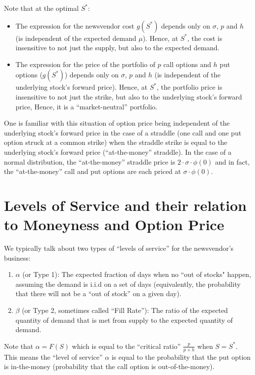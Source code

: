 \documentclass[11pt, oneside]{article}   	%
\begin{document}
Note that at the optimal $S^*$:

\begin{itemize}
\item The expression for the newsvendor cost $g(S^*)$ depends only on $\sigma$, $p$ and $h$ (is independent of the expected demand $\mu$). Hence, at $S^*$, the cost is insensitive to not just the supply, but also to the expected demand.
\item The expression for the price of the portfolio of $p$ call options and $h$ put options ($g(S^*)$) depends only on $\sigma$, $p$ and $h$ (is independent of the underlying stock's forward price). Hence, at $S^*$, the portfolio price is insensitive to not just the strike, but also to the underlying stock's forward price, Hence, it is a ``market-neutral'' portfolio.
\end{itemize}

One is familiar with this situation of option price being independent of the underlying stock's forward price in the case of a straddle (one call and one put option struck at a common strike) when the straddle strike is equal to the underlying stock's forward price (``at-the-money'' straddle). In the case of a normal distribution, the ``at-the-money'' straddle price is $2 \cdot \sigma \cdot \phi(0)$ and in fact, the ``at-the-money'' call and put options are each priced at $\sigma \cdot \phi(0)$.

\section{Levels of Service and their relation to Moneyness and Option Price}

We typically talk about two types of ``levels of service'' for the newsvendor's business:
\begin{enumerate}
\item $\alpha$ (or Type 1): The expected fraction of days when no ``out of stocks" happen, assuming the demand is i.i.d on a set of days (equivalently, the probability that there will not be a ``out of stock'' on a given day).
\item $\beta$ (or Type 2, sometimes called ``Fill Rate''): The ratio of the expected quantity of demand that is met from supply to the expected quantity of demand.
\end{enumerate}

Note that $\alpha = F(S)$ which is equal to the ``critical ratio'' $\frac p {p + h}$ when $S = S^*$. This means the ``level of service'' $\alpha$ is equal to the probability that the put option is in-the-money (probability that the call option is out-of-the-money).
\end{document}

